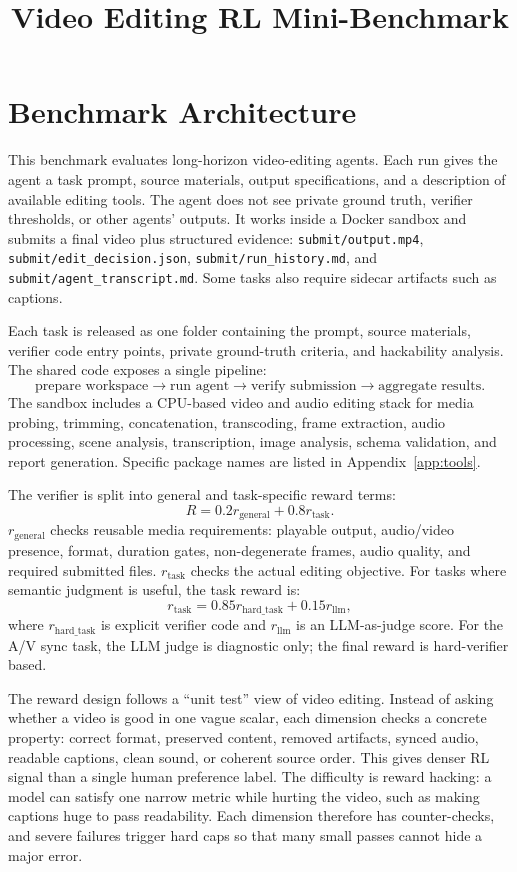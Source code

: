 \documentclass[11pt]{article}
\title{Video Editing RL Mini-Benchmark}
\author{}
\date{}
\begin{document}
\maketitle

\section{Benchmark Architecture}

This benchmark evaluates long-horizon video-editing agents. Each run gives the agent a task prompt, source materials, output specifications, and a description of available editing tools. The agent does not see private ground truth, verifier thresholds, or other agents' outputs. It works inside a Docker sandbox and submits a final video plus structured evidence: \texttt{submit/output.mp4}, \texttt{submit/edit\_decision.json}, \texttt{submit/run\_history.md}, and \texttt{submit/agent\_transcript.md}. Some tasks also require sidecar artifacts such as captions.

Each task is released as one folder containing the prompt, source materials, verifier code entry points, private ground-truth criteria, and hackability analysis. The shared code exposes a single pipeline:
\[
\text{prepare workspace} \rightarrow \text{run agent} \rightarrow \text{verify submission} \rightarrow \text{aggregate results}.
\]
The sandbox includes a CPU-based video and audio editing stack for media probing, trimming, concatenation, transcoding, frame extraction, audio processing, scene analysis, transcription, image analysis, schema validation, and report generation. Specific package names are listed in Appendix~\ref{app:tools}.

The verifier is split into general and task-specific reward terms:
\[
R = 0.2 r_{\mathrm{general}} + 0.8 r_{\mathrm{task}}.
\]
\(r_{\mathrm{general}}\) checks reusable media requirements: playable output, audio/video presence, format, duration gates, non-degenerate frames, audio quality, and required submitted files. \(r_{\mathrm{task}}\) checks the actual editing objective. For tasks where semantic judgment is useful, the task reward is:
\[
r_{\mathrm{task}} = 0.85 r_{\mathrm{hard\_task}} + 0.15 r_{\mathrm{llm}},
\]
where \(r_{\mathrm{hard\_task}}\) is explicit verifier code and \(r_{\mathrm{llm}}\) is an LLM-as-judge score. For the A/V sync task, the LLM judge is diagnostic only; the final reward is hard-verifier based.

The reward design follows a ``unit test'' view of video editing. Instead of asking whether a video is good in one vague scalar, each dimension checks a concrete property: correct format, preserved content, removed artifacts, synced audio, readable captions, clean sound, or coherent source order. This gives denser RL signal than a single human preference label. The difficulty is reward hacking: a model can satisfy one narrow metric while hurting the video, such as making captions huge to pass readability. Each dimension therefore has counter-checks, and severe failures trigger hard caps so that many small passes cannot hide a major error.
\end{document}
